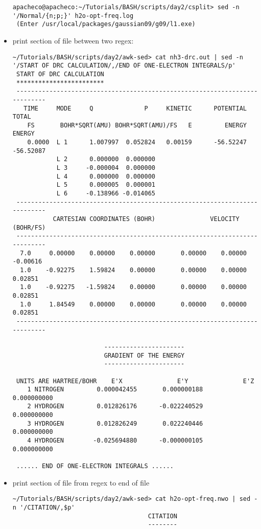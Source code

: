 \documentclass[10pt,t]{beamer}
\begin{document}
\begin{frame}
\begin{itemize}
\begin{lstlisting}[style=LINUX]
apacheco@apacheco:~/Tutorials/BASH/scripts/day2/csplit> sed -n '/Normal/{n;p;}' h2o-opt-freq.log 
 (Enter /usr/local/packages/gaussian09/g09/l1.exe)
      \end{lstlisting}
      \framebreak
    \item print section of file between two regex:
      \begin{lstlisting}[style=LINUX]
~/Tutorials/BASH/scripts/day2/awk-sed> cat nh3-drc.out | sed -n '/START OF DRC CALCULATION/,/END OF ONE-ELECTRON INTEGRALS/p'
 START OF DRC CALCULATION
 ************************
 ---------------------------------------------------------------------------
   TIME     MODE     Q              P     KINETIC      POTENTIAL          TOTAL
    FS       BOHR*SQRT(AMU) BOHR*SQRT(AMU)/FS   E         ENERGY         ENERGY
    0.0000  L 1      1.007997  0.052824   0.00159      -56.52247      -56.52087
            L 2      0.000000  0.000000
            L 3     -0.000004  0.000000
            L 4      0.000000  0.000000
            L 5      0.000005  0.000001
            L 6     -0.138966 -0.014065
 ---------------------------------------------------------------------------
           CARTESIAN COORDINATES (BOHR)               VELOCITY (BOHR/FS)
 ---------------------------------------------------------------------------
  7.0     0.00000    0.00000    0.00000       0.00000    0.00000   -0.00616
  1.0    -0.92275    1.59824    0.00000       0.00000    0.00000    0.02851
  1.0    -0.92275   -1.59824    0.00000       0.00000    0.00000    0.02851
  1.0     1.84549    0.00000    0.00000       0.00000    0.00000    0.02851
 ---------------------------------------------------------------------------

                         ----------------------
                         GRADIENT OF THE ENERGY
                         ----------------------

 UNITS ARE HARTREE/BOHR    E'X               E'Y               E'Z 
    1 NITROGEN         0.000042455       0.000000188       0.000000000
    2 HYDROGEN         0.012826176      -0.022240529       0.000000000
    3 HYDROGEN         0.012826249       0.022240446       0.000000000
    4 HYDROGEN        -0.025694880      -0.000000105       0.000000000
 
 ...... END OF ONE-ELECTRON INTEGRALS ......
      \end{lstlisting}
      \framebreak
    \item print section of file from regex to end of file
      \begin{lstlisting}[style=LINUX]
~/Tutorials/BASH/scripts/day2/awk-sed> cat h2o-opt-freq.nwo | sed -n '/CITATION/,$p'
                                     CITATION
                                     --------


\end{lstlisting}
\end{itemize}
\end{frame}
\end{document}
